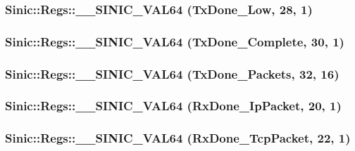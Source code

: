 \label{namespaceSinic_1_1Regs_ab8855564b0d8a0f52607d6b83fd6c6ab}
\hypertarget{namespaceSinic_1_1Regs_a42a2d957bef61bfe83e833f88dcb925b}{
\subsubsection[{\_\-\_\-SINIC\_\-VAL64}]{\setlength{\rightskip}{0pt plus 5cm}Sinic::Regs::\_\-\_\-SINIC\_\-VAL64 (TxDone\_\-Low, \/  28, \/  1)}}
\label{namespaceSinic_1_1Regs_a42a2d957bef61bfe83e833f88dcb925b}
\hypertarget{namespaceSinic_1_1Regs_a9fb08f4dcf913c94b9c8e4d93da6343a}{
\subsubsection[{\_\-\_\-SINIC\_\-VAL64}]{\setlength{\rightskip}{0pt plus 5cm}Sinic::Regs::\_\-\_\-SINIC\_\-VAL64 (TxDone\_\-Complete, \/  30, \/  1)}}
\label{namespaceSinic_1_1Regs_a9fb08f4dcf913c94b9c8e4d93da6343a}
\hypertarget{namespaceSinic_1_1Regs_a2471d15988da51d14d87e98543cb61d5}{
\subsubsection[{\_\-\_\-SINIC\_\-VAL64}]{\setlength{\rightskip}{0pt plus 5cm}Sinic::Regs::\_\-\_\-SINIC\_\-VAL64 (TxDone\_\-Packets, \/  32, \/  16)}}
\label{namespaceSinic_1_1Regs_a2471d15988da51d14d87e98543cb61d5}
\hypertarget{namespaceSinic_1_1Regs_a644ca1227abc29d02e3bb265b2da3d6a}{
\subsubsection[{\_\-\_\-SINIC\_\-VAL64}]{\setlength{\rightskip}{0pt plus 5cm}Sinic::Regs::\_\-\_\-SINIC\_\-VAL64 (RxDone\_\-IpPacket, \/  20, \/  1)}}
\label{namespaceSinic_1_1Regs_a644ca1227abc29d02e3bb265b2da3d6a}
\hypertarget{namespaceSinic_1_1Regs_a9dfc142d1cf5dd6b3e90c3ce59473f0e}{
\subsubsection[{\_\-\_\-SINIC\_\-VAL64}]{\setlength{\rightskip}{0pt plus 5cm}Sinic::Regs::\_\-\_\-SINIC\_\-VAL64 (RxDone\_\-TcpPacket, \/  22, \/  1)}}
